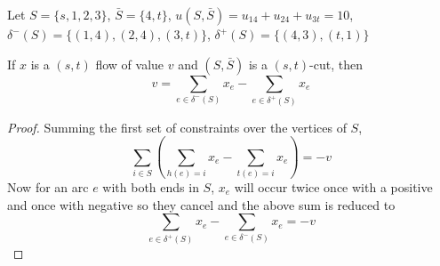             \begin{example}
                \begin{figure}[H]
                    \centering
                \end{figure}

                Let $S = \{s, 1, 2, 3\}$, $\bar{S} = \{4, t\}$, $u(S, \bar{S}) = u_{14} + u_{24} + u_{3t} = 10$, $\delta^-(S) = \{(1, 4), (2, 4), (3, t)\}$, $\delta^+(S) = \{(4, 3), (t, 1)\}$
            \end{example}

            \begin{lemma}
                If $x$ is a $(s, t)$ flow of value $v$ and $(S, \bar{S})$ is a $(s, t)$-cut, then
                \begin{equation*}
                    v = \sum_{e\in \delta^-(S)} x_e - \sum_{e\in \delta^+(S)} x_e
                \end{equation*}
            \end{lemma}

            \begin{proof}
                Summing the first set of constraints over the vertices of $S$,
                \begin{equation*}
                    \sum_{i\in S} (\sum_{h(e) = i}x_e - \sum_{t(e) = i}x_e) = -v
                \end{equation*}
                Now for an arc $e$ with both ends in $S$, $x_e$ will occur twice once with a positive and once with negative so they cancel and the above sum is reduced to
                \begin{equation*}
                    \sum_{e\in \delta^+(S)}x_e - \sum_{e \in \delta^-(S)}x_e = -v
                \end{equation*}
            \end{proof}

